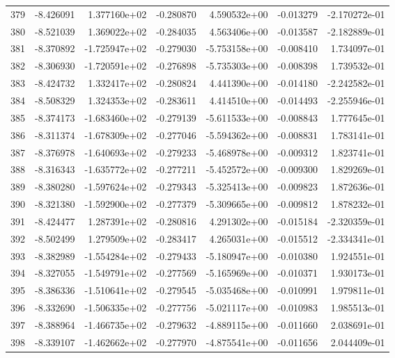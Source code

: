 \begin{tabular}{rrrrrrr}
 379 &  -8.426091 &  1.377160e+02 & -0.280870 &  4.590532e+00 &  -0.013279 & -2.170272e-01 \\
 380 &  -8.521039 &  1.369022e+02 & -0.284035 &  4.563406e+00 &  -0.013587 & -2.182889e-01 \\
 381 &  -8.370892 & -1.725947e+02 & -0.279030 & -5.753158e+00 &  -0.008410 &  1.734097e-01 \\
 382 &  -8.306930 & -1.720591e+02 & -0.276898 & -5.735303e+00 &  -0.008398 &  1.739532e-01 \\
 383 &  -8.424732 &  1.332417e+02 & -0.280824 &  4.441390e+00 &  -0.014180 & -2.242582e-01 \\
 384 &  -8.508329 &  1.324353e+02 & -0.283611 &  4.414510e+00 &  -0.014493 & -2.255946e-01 \\
 385 &  -8.374173 & -1.683460e+02 & -0.279139 & -5.611533e+00 &  -0.008843 &  1.777645e-01 \\
 386 &  -8.311374 & -1.678309e+02 & -0.277046 & -5.594362e+00 &  -0.008831 &  1.783141e-01 \\
 387 &  -8.376978 & -1.640693e+02 & -0.279233 & -5.468978e+00 &  -0.009312 &  1.823741e-01 \\
 388 &  -8.316343 & -1.635772e+02 & -0.277211 & -5.452572e+00 &  -0.009300 &  1.829269e-01 \\
 389 &  -8.380280 & -1.597624e+02 & -0.279343 & -5.325413e+00 &  -0.009823 &  1.872636e-01 \\
 390 &  -8.321380 & -1.592900e+02 & -0.277379 & -5.309665e+00 &  -0.009812 &  1.878232e-01 \\
 391 &  -8.424477 &  1.287391e+02 & -0.280816 &  4.291302e+00 &  -0.015184 & -2.320359e-01 \\
 392 &  -8.502499 &  1.279509e+02 & -0.283417 &  4.265031e+00 &  -0.015512 & -2.334341e-01 \\
 393 &  -8.382989 & -1.554284e+02 & -0.279433 & -5.180947e+00 &  -0.010380 &  1.924551e-01 \\
 394 &  -8.327055 & -1.549791e+02 & -0.277569 & -5.165969e+00 &  -0.010371 &  1.930173e-01 \\
 395 &  -8.386336 & -1.510641e+02 & -0.279545 & -5.035468e+00 &  -0.010991 &  1.979811e-01 \\
 396 &  -8.332690 & -1.506335e+02 & -0.277756 & -5.021117e+00 &  -0.010983 &  1.985513e-01 \\
 397 &  -8.388964 & -1.466735e+02 & -0.279632 & -4.889115e+00 &  -0.011660 &  2.038691e-01 \\
 398 &  -8.339107 & -1.462662e+02 & -0.277970 & -4.875541e+00 &  -0.011656 &  2.044409e-01 \\

\end{tabular}
